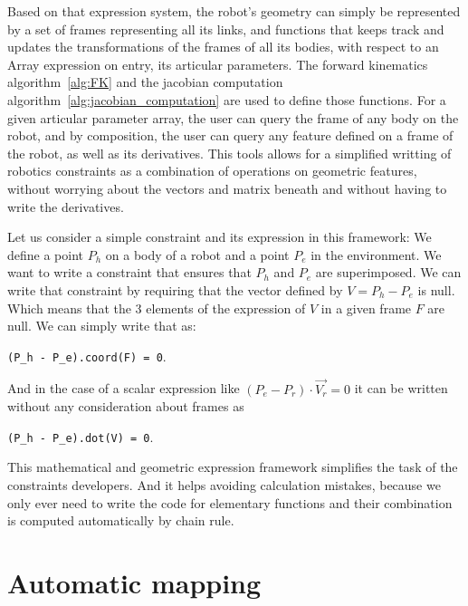 Based on that expression system, the robot's geometry can simply be represented by a set of frames representing all its links, and functions that keeps track and updates the transformations of the frames of all its bodies, with respect to an Array expression on entry, its articular parameters.
The forward kinematics algorithm~\ref{alg:FK} and the jacobian computation algorithm~\ref{alg:jacobian_computation} are used to define those functions.
For a given articular parameter array, the user can query the frame of any body on the robot, and by composition, the user can query any feature defined on a frame of the robot, as well as its derivatives.
This tools allows for a simplified writting of robotics constraints as a combination of operations on geometric features, without worrying about the vectors and matrix beneath and without having to write the derivatives.

Let us consider a simple constraint and its expression in this framework:
We define a point $P_h$ on a body of a robot and a point $P_e$ in the environment.
We want to write a constraint that ensures that $P_h$ and $P_e$ are superimposed.
We can write that constraint by requiring that the vector defined by $V = P_h - P_e$ is null.
Which means that the 3 elements of the expression of $V$ in a given frame $F$ are null.
We can simply write that as:
\begin{center}
{\tt(P\_h - P\_e).coord(F) = 0}.
\end{center}
And in the case of a scalar expression like $(P_e - P_r)\cdot \overrightarrow{V_r} = 0$ it can be written without any consideration about frames as
\begin{center}
{\tt(P\_h - P\_e).dot(V) = 0}.
\end{center}

This mathematical and geometric expression framework simplifies the task of the constraints developers.
And it helps avoiding calculation mistakes, because we only ever need to write the code for elementary functions and their combination is computed automatically by chain rule.



\section{Automatic mapping}
\label{sec:automatic_mapping}

